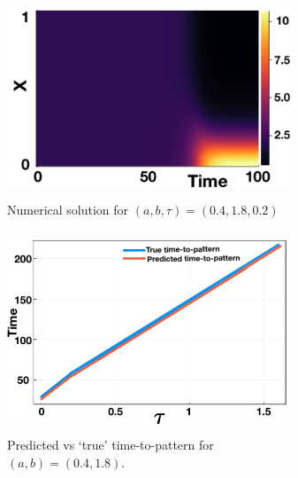 \documentclass[12pt]{report}
\begin{document}
\begin{figure}[H]
    \centering
    \begin{subfigure}[b]{0.45\textwidth}
        \centering
        \includegraphics[width=8.5cm,height=6cm]{dispnumsim.png}
        \caption{Numerical solution for $(a,b,\tau)=(0.4,1.8,0.2)$}
        \label{fig:dispnumsim}
    \end{subfigure}
    \hfill
    \begin{subfigure}[b]{0.45\textwidth}
        \centering
        \includegraphics[width=8.5cm,height=6cm]{ttp1.png}
        \caption{Predicted vs `true' time-to-pattern for $(a,b)=(0.4,1.8)$.}
        \label{fig:ttp1}
    \end{subfigure}
    \caption{}
    \label{}
\end{figure}
\end{document}
